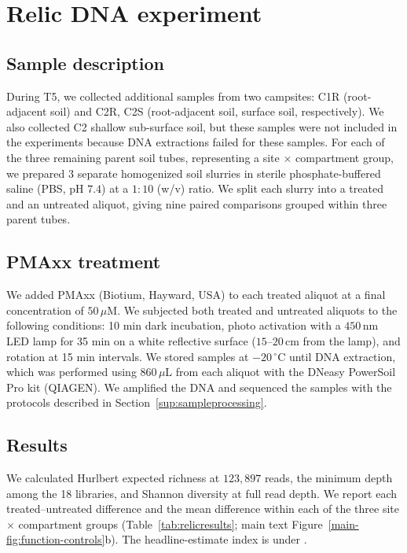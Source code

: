 \documentclass[11pt]{article}
\begin{document}
\section{Relic DNA experiment}\label{sup:relic}
\subsection{Sample description}
During T5, we collected additional samples from two campsites: C1R (root-adjacent soil) and C2R, C2S (root-adjacent soil, surface soil, respectively). We also collected C2 shallow sub-surface soil, but these samples were not included in the experiments because DNA extractions failed for these samples. For each of the three remaining parent soil tubes, representing a site $\times$ compartment group, we prepared $3$ separate homogenized soil slurries in sterile phosphate-buffered saline (PBS, pH $7.4$) at a $1:10$ (w/v) ratio. We split each slurry into a treated and an untreated aliquot, giving nine paired comparisons grouped within three parent tubes.

\subsection{PMAxx treatment}
We added PMAxx (Biotium, Hayward, USA) to each treated aliquot at a final concentration of $50\,\mu\mathrm{M}$. We subjected both treated and untreated aliquots to the following conditions: 10 min dark incubation, photo activation with a $450\,\mathrm{nm}$ LED lamp for 35 min on a white reflective surface ($15$--$20\,\mathrm{cm}$ from the lamp), and rotation at 15 min intervals. We stored samples at $-20\,^{\circ}\mathrm{C}$ until DNA extraction, which was performed using $860\,\mu\mathrm{L}$ from each aliquot with the DNeasy PowerSoil Pro kit (QIAGEN). We amplified the DNA and sequenced the samples with the protocols described in Section~\ref{sup:sampleprocessing}.

\subsection{Results}
We calculated Hurlbert expected richness at $123{,}897$ reads, the minimum
depth among the 18 libraries, and Shannon diversity at full read depth. We report each treated--untreated difference and the mean difference within each of the three site $\times$ compartment groups (Table~\ref{tab:relicresults}; main text Figure~\ref{main-fig:function-controls}b). The headline-estimate index is under .
\end{document}
